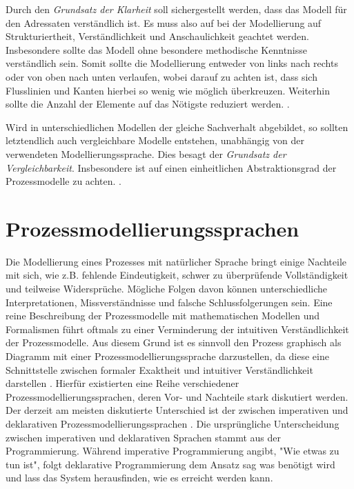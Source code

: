 Durch den \textit{Grundsatz der Klarheit} soll sichergestellt werden, dass das Modell für den Adressaten verständlich ist. Es muss also auf bei der Modellierung auf Strukturiertheit, Verständlichkeit und Anschaulichkeit geachtet werden. Insbesondere sollte das Modell ohne besondere methodische Kenntnisse verständlich sein. Somit sollte die Modellierung entweder von links nach rechts oder von oben nach unten verlaufen, wobei darauf zu achten ist, dass sich Flusslinien und Kanten hierbei so wenig wie möglich überkreuzen. Weiterhin sollte die Anzahl der Elemente auf das Nötigste reduziert werden.  \cite{leimeister2012,journals95, freund2007,reinshagen2009, becker2012prozessmanagement,koch2011}.\newline

Wird in unterschiedlichen Modellen der gleiche Sachverhalt abgebildet, so sollten letztendlich auch vergleichbare Modelle entstehen, unabhängig von der verwendeten Modellierungssprache. Dies besagt der \textit{Grundsatz der Vergleichbarkeit}. Insbesondere ist auf einen einheitlichen Abstraktionsgrad der Prozessmodelle zu achten. \cite{leimeister2012, journals95, freund2007,reinshagen2009}.\newline


\section{Prozessmodellierungssprachen}\label{sec:chapter3:Prozessmodellierungssprachen}

Die Modellierung eines Prozesses mit natürlicher Sprache bringt einige Nachteile mit sich, wie z.B. fehlende Eindeutigkeit, schwer zu überprüfende Vollständigkeit und teilweise Widersprüche. Mögliche Folgen davon können unterschiedliche Interpretationen, Missverständnisse und falsche Schlussfolgerungen sein. Eine reine Beschreibung der Prozessmodelle mit mathematischen Modellen und Formalismen führt oftmals zu einer Verminderung der intuitiven Verständlichkeit der Prozessmodelle. Aus diesem Grund ist es sinnvoll den Prozess graphisch als Diagramm mit einer Prozessmodellierungssprache darzustellen, da diese eine Schnittstelle zwischen formaler Exaktheit und intuitiver Verständlichkeit darstellen \cite{thomas2009,kircher2006}.  \newline
Hierfür existierten eine Reihe verschiedener Prozessmodellierungssprachen, deren Vor- und Nachteile stark diskutiert werden. Der derzeit am meisten diskutierte Unterschied ist der zwischen imperativen und deklarativen Prozessmodellierungssprachen \cite{fahland2009}. \newline
Die ursprüngliche Unterscheidung zwischen imperativen und deklarativen Sprachen stammt aus der Programmierung. Während imperative Programmierung angibt, "Wie etwas zu tun ist", folgt deklarative Programmierung dem Ansatz \grqq sag was benötigt wird und lass das System herausfinden, wie es erreicht werden kann\grqq \cite{pichler2012}.

